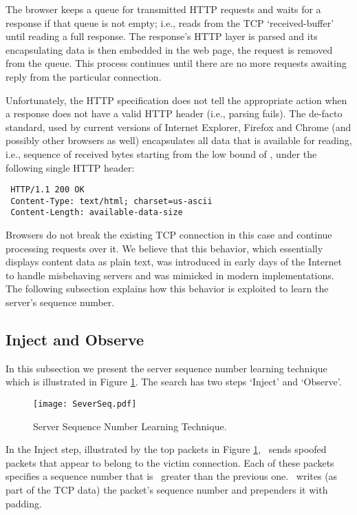 \documentclass[conference]{IEEEtran}
\newcommand{\wndsize}{}
\newcommand{\cwnd}{}
\begin{document}
The browser keeps a queue for transmitted HTTP requests and waits for a response if that queue is not empty; i.e., reads from the TCP `received-buffer' until reading a full response. The response's HTTP layer is parsed and its encapsulating data is then embedded in the web page, the request is removed from the queue. This process continues until there are no more requests awaiting reply from the particular connection.

Unfortunately, the HTTP specification does not tell the appropriate action when a response does not have a valid HTTP header (i.e., parsing fails). The de-facto standard, used by current versions of Internet Explorer, Firefox and Chrome (and possibly other browsers as well) encapsulates all data that is available for reading, i.e., sequence of received bytes starting from the low bound of \cwnd, under the following single HTTP header:

\begin{verbatim}
 HTTP/1.1 200 OK
 Content-Type: text/html; charset=us-ascii
 Content-Length: available-data-size
\end{verbatim}

Browsers do not break the existing TCP connection in this case and continue processing requests over it. We believe that this behavior, which essentially displays content data as plain text, was introduced in early days of the Internet to handle misbehaving servers and was mimicked in modern implementations. The following subsection explains how this behavior is exploited to learn the server's sequence number.

\subsection{Inject and Observe} \label{serversnum}
In this subsection we present the server sequence number learning technique which is illustrated in Figure \ref{fig:injectandobserve}. The search has two steps `Inject' and `Observe'.

\begin{figure}
  \begin{center}
    \texttt{[image: SeverSeq.pdf]}
  \end{center}
  \caption{Server Sequence Number Learning Technique.}
    \label{fig:injectandobserve}
\end{figure}


In the Inject step, illustrated by the top packets in Figure \ref{fig:injectandobserve}, \mal\ sends spoofed packets that appear to belong to the victim connection. Each of these packets specifies a sequence number that is \wndsize\ greater than the previous one. \mal\ writes (as part of the TCP data) the packet's sequence number and prependers it with padding. 
\end{document}
